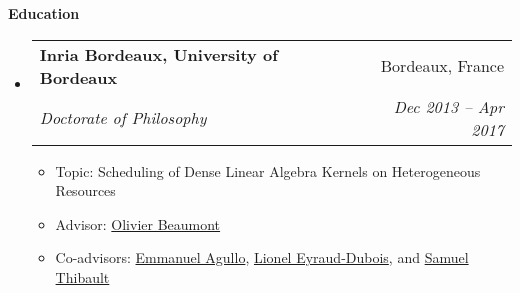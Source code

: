 \documentclass[letterpaper,11pt]{article}
\makeatletter
\newcommand{\resitem}[1]{\item #1 \vspace{-2pt}}
\newcommand{\resheading}[1]{{\large \colorbox{mygrey}{\begin{minipage}{\textwidth}{\textbf{#1 \vphantom{p\^{E}}}}\end{minipage}}}}
\newcommand{\ressubheading}[4]{
\begin{tabular*}{6.5in}{l@{\extracolsep{\fill}}r}
		\textbf{#1} & #2 \\
		\textit{#3} & \textit{#4} \\
\end{tabular*}\vspace{-6pt}}
\makeatother
\begin{document}
\vspace{0.1in} 
\resheading{Education}
	\begin{itemize}
		\item
			\ressubheading{{Inria Bordeaux, University of Bordeaux}}{Bordeaux, France}{{Doctorate of Philosophy}}{Dec 2013 -- Apr 2017}
				{ \footnotesize
				\begin{itemize}
					\item Topic: Scheduling of Dense Linear Algebra Kernels on Heterogeneous Resources
					\item Advisor: \href{https://dblp.uni-trier.de/pid/89/2078.html}{Olivier Beaumont}
					\item Co-advisors: \href{https://dblp.uni-trier.de/pid/59/1733.html}{Emmanuel Agullo}, \href{https://dblp.uni-trier.de/pid/e/LionelEyraudDubois.html}{Lionel Eyraud-Dubois}, and \href{https://scholar.google.fr/citations?user=Gk0anzsAAAAJ}{Samuel Thibault}
				\end{itemize}
				}
				

\end{itemize}
\end{document}
